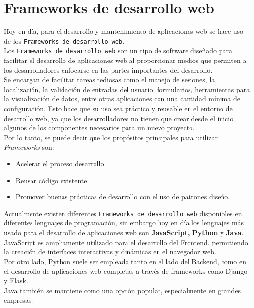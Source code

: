 \section{Frameworks de desarrollo web}\label{sec:framework}

Hoy en día, para el desarrollo y mantenimiento de aplicaciones web se hace uso de los \texttt{Frameworks de desarrollo web}.\\

Los \texttt{Frameworks de desarrollo web} son un tipo de software diseñado para facilitar el desarrollo de aplicaciones web al proporcionar medios que permiten a los desarrolladores enfocarse en las partes importantes del desarrollo. \\
Se encargan de facilitar tareas tediosas como el manejo de sesiones, la localización, la validación de entradas del usuario, formularios, herramientas para la visualización de datos, entre otras aplicaciones con una cantidad mínima de configuración. Esto hace que su uso sea práctico y reusable en el entorno de desarrollo web, ya que los desarrolladores no tienen que crear desde el inicio algunos de los componentes necesarios para un nuevo proyecto.\\

Por lo tanto, se puede decir que los propósitos principales para utilizar \textit{Frameworks} son:

\begin{itemize}
    \item Acelerar el proceso desarrollo.
    \item Reusar código existente.
    \item Promover buenas prácticas de desarrollo con el uso de patrones diseño.    
\end{itemize}

Actualmente existen diferentes \texttt{Frameworks de desarrollo web} disponibles en diferentes lenguajes de programación, sin embargo hoy en día los lenguajes más usado para el desarrollo de aplicaciones web son \textbf{JavaScript, Python} y \textbf{Java}. \\

JavaScript es ampliamente utilizado para el desarrollo del  Frontend, permitiendo la creación de interfaces interactivas y dinámicas en el navegador web. \\
Por otro lado, Python suele ser empleado tanto en el lado del Backend, como en el desarrollo de aplicaciones web completas a través de frameworks como Django y Flask. \\
Java también se mantiene como una opción popular, especialmente en grandes empresas.

